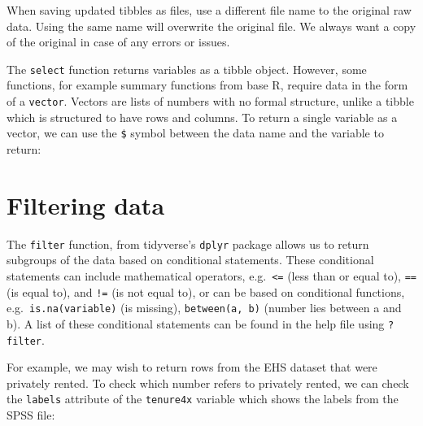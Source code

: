 \documentclass[
  letterpaper,
  DIV=11,
  numbers=noendperiod]{scrreprt}
\newenvironment{Shaded}{\begin{snugshade}}{\end{snugshade}}
\newcommand{\NormalTok}[1]{\textcolor[rgb]{0.00,0.23,0.31}{#1}}
\newcommand{\SpecialCharTok}[1]{\textcolor[rgb]{0.37,0.37,0.37}{#1}}
\begin{document}
\begin{tcolorbox}[enhanced jigsaw, bottomrule=.15mm, left=2mm, leftrule=.75mm, bottomtitle=1mm, coltitle=black, colbacktitle=quarto-callout-warning-color!10!white, toptitle=1mm, arc=.35mm, breakable, title=\textcolor{quarto-callout-warning-color}{\faExclamationTriangle}\hspace{0.5em}{Warning}, rightrule=.15mm, toprule=.15mm, opacityback=0, opacitybacktitle=0.6, titlerule=0mm, colback=white, colframe=quarto-callout-warning-color-frame]

When saving updated tibbles as files, use a different file name to the
original raw data. Using the same name will overwrite the original file.
We always want a copy of the original in case of any errors or issues.

\end{tcolorbox}

The \texttt{select} function returns variables as a tibble object.
However, some functions, for example summary functions from base R,
require data in the form of a \texttt{vector}. Vectors are lists of
numbers with no formal structure, unlike a tibble which is structured to
have rows and columns. To return a single variable as a vector, we can
use the \texttt{\$} symbol between the data name and the variable to
return:

\begin{Shaded}
\end{Shaded}

\section{Filtering data}\label{filtering-data}

The \texttt{filter} function, from tidyverse's \texttt{dplyr} package
allows us to return subgroups of the data based on conditional
statements. These conditional statements can include mathematical
operators, e.g.~\texttt{\textless{}=} (less than or equal to),
\texttt{==} (is equal to), and \texttt{!=} (is not equal to), or can be
based on conditional functions, e.g.~\texttt{is.na(variable)} (is
missing), \texttt{between(a,\ b)} (number lies between a and b). A list
of these conditional statements can be found in the help file using
\texttt{?filter}.

For example, we may wish to return rows from the EHS dataset that were
privately rented. To check which number refers to privately rented, we
can check the \texttt{labels} attribute of the \texttt{tenure4x}
variable which shows the labels from the SPSS file:
\end{document}
